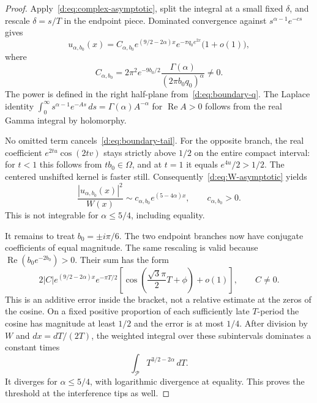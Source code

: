 \documentclass[11pt,a4paper]{article}
\numberwithin{equation}{section}
\theoremstyle{definition}\newtheorem{definition}[theorem]{Definition}
\theoremstyle{remark}\newtheorem{remark}[theorem]{Remark}
\begin{document}
\begin{proof}
Apply~\eqref{d:eq:complex-asymptotic}, split the integral at a small fixed $\delta$, and rescale $\delta=s/T$ in the endpoint piece. Dominated convergence against $s^{\alpha-1}e^{-cs}$ gives
\begin{equation}\label{d:eq:boundary-tail}
 u_{\alpha,b_0}(x)
 =C_{\alpha,b_0}e^{(9/2-2\alpha)x}
       e^{-\pi q_0e^{2x}}\bigl(1+o(1)\bigr),
\end{equation}
where
\begin{equation}\label{d:eq:boundary-constant}
 C_{\alpha,b_0}
 =2\pi^2 e^{-9b_0/2}
      \frac{\Gamma(\alpha)}{(2\pi b_0q_0)^\alpha}\ne0.
\end{equation}
The power is defined in the right half-plane from~\eqref{d:eq:boundary-q}. The Laplace identity
$\int_0^\infty s^{\alpha-1}e^{-As}\,ds
 =\Gamma(\alpha)A^{-\alpha}$ for $\operatorname{Re}A>0$
follows from the real Gamma integral by holomorphy.

No omitted term cancels~\eqref{d:eq:boundary-tail}. For the opposite branch, the real coefficient $e^{2tu}\cos(2tv)$ stays strictly above $1/2$ on the entire compact interval: for $t<1$ this follows from $tb_0\in\Omega$, and at $t=1$ it equals $e^{4u}/2>1/2$. The centered unshifted kernel is faster still. Consequently~\eqref{d:eq:W-asymptotic} yields
\begin{equation}\label{d:eq:boundary-weighted-tail}
 \frac{|u_{\alpha,b_0}(x)|^2}{W(x)}
 \sim c_{\alpha,b_0}e^{(5-4\alpha)x},
 \qquad c_{\alpha,b_0}>0.
\end{equation}
This is not integrable for $\alpha\le5/4$, including equality.

It remains to treat $b_0=\pm i\pi/6$. The two endpoint branches now have conjugate coefficients of equal magnitude. The same rescaling is valid because $\operatorname{Re}(b_0e^{-2b_0})>0$. Their sum has the form
\begin{equation}\label{d:eq:boundary-tip}
 2|C|e^{(9/2-2\alpha)x}e^{-\pi T/2}
 \left[\cos\left(\frac{\sqrt3\pi}{2}T+\phi\right)+o(1)\right],
 \qquad C\ne0.
\end{equation}
This is an additive error inside the bracket, not a relative estimate at the zeros of the cosine. On a fixed positive proportion of each sufficiently late $T$-period the cosine has magnitude at least $1/2$ and the error is at most $1/4$. After division by $W$ and $dx=dT/(2T)$, the weighted integral over these subintervals dominates a constant times
\[
 \int_{\mathcal P} T^{3/2-2\alpha}\,dT.
\]
It diverges for $\alpha\le5/4$, with logarithmic divergence at equality. This proves the threshold at the interference tips as well.


\end{proof}
\end{document}
